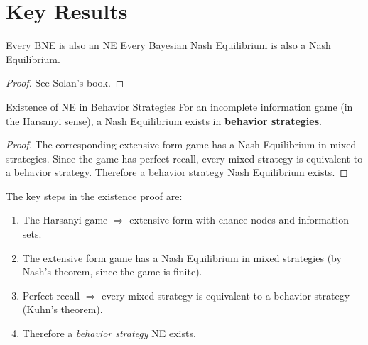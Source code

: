 \documentclass[12pt, a4paper]{article}
\begin{document}
\section{Key Results}

\begin{propbox}{Every BNE is also an NE}
Every Bayesian Nash Equilibrium is also a Nash Equilibrium.
\end{propbox}
\begin{proof}
See Solan's book.
\end{proof}

\begin{thmbox}{Existence of NE in Behavior Strategies}
For an incomplete information game (in the Harsanyi sense), a Nash Equilibrium exists in \textbf{behavior strategies}.
\end{thmbox}
\begin{proof}
The corresponding extensive form game has a Nash Equilibrium in mixed strategies. Since the game has perfect recall, every mixed strategy is equivalent to a behavior strategy. Therefore a behavior strategy Nash Equilibrium exists.
\end{proof}

\begin{intubox}
  The key steps in the existence proof are:
  \begin{enumerate}
    \item The Harsanyi game $\Rightarrow$ extensive form with chance nodes and information sets.
    \item The extensive form game has a Nash Equilibrium in mixed strategies (by Nash's theorem, since the game is finite).
    \item Perfect recall $\Rightarrow$ every mixed strategy is equivalent to a behavior strategy (Kuhn's theorem).
    \item Therefore a \emph{behavior strategy} NE exists.
  \end{enumerate}
\end{intubox}
\end{document}
